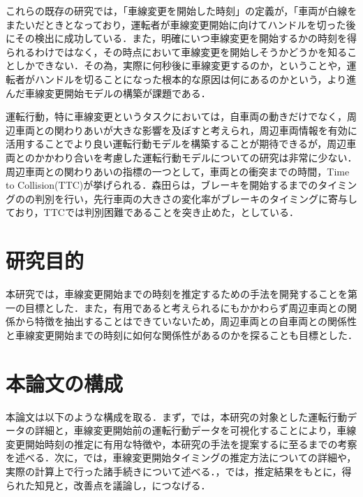 これらの既存の研究では，「車線変更を開始した時刻」の定義が，「車両が白線をまたいだときとなっており，運転者が車線変更開始に向けてハンドルを切った後にその検出に成功している．また，明確にいつ車線変更を開始するかの時刻を得られるわけではなく，その時点において車線変更を開始しそうかどうかを知ることしかできない．その為，実際に何秒後に車線変更するのか，ということや，運転者がハンドルを切ることになった根本的な原因は何にあるのかという，より進んだ車線変更開始モデルの構築が課題である．
\par
運転行動，特に車線変更というタスクにおいては，自車両の動きだけでなく，周辺車両との関わりあいが大きな影響を及ぼすと考えられ，周辺車両情報を有効に活用することでより良い運転行動モデルを構築することが期待できるが，周辺車両とのかかわり合いを考慮した運転行動モデルについての研究は非常に少ない\cite{survey}．周辺車両との関わりあいの指標の一つとして，車両との衝突までの時間，Time to Collision(TTC)が挙げられる．森田\cite{Morita}らは，ブレーキを開始するまでのタイミングのの判別を行い，先行車両の大きさの変化率がブレーキのタイミングに寄与しており，TTCでは判別困難であることを突き止めた，としている．
\\
\section{研究目的}
本研究では，車線変更開始までの時刻を推定するための手法を開発することを第一の目標とした．また，有用であると考えられるにもかかわらず周辺車両との関係から特徴を抽出することはできていないため，周辺車両との自車両との関係性と車線変更開始までの時刻に如何な関係性があるのかを探ることも目標とした．
\\
\section{本論文の構成}
本論文は以下のような構成を取る．まず，では，本研究の対象とした運転行動データの詳細と，車線変更開始前の運転行動データを可視化することにより，車線変更開始時刻の推定に有用な特徴や，本研究の手法を提案するに至るまでの考察を述べる．次に，では，車線変更開始タイミングの推定方法についての詳細や，実際の計算上で行った諸手続きについて述べる．，では，推定結果をもとに，得られた知見と，改善点を議論し，につなげる．



